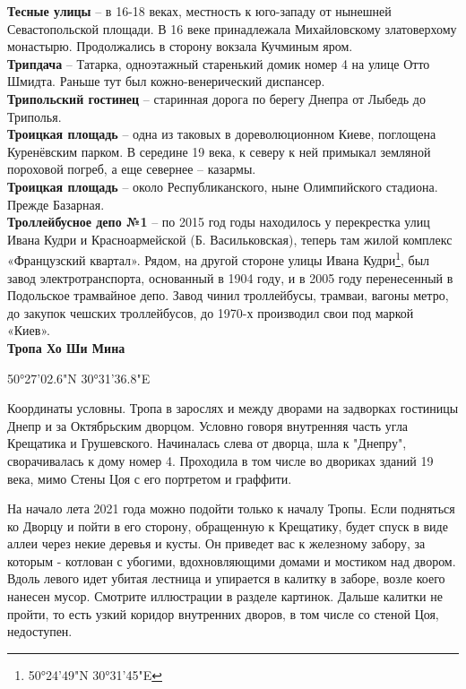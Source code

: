 \textbf{Тесные улицы} – в 16-18 веках, местность к юго-западу от нынешней Севастопольской площади. В 16 веке принадлежала Михайловскому златоверхому монастырю. Продолжались в сторону вокзала Кучминым яром.\\

\textbf{Трипдача} – Татарка, одноэтажный старенький домик номер 4 на улице Отто Шмидта. Раньше тут был кожно-венерический диспансер.\\

\textbf{Трипольский гостинец} – старинная дорога по берегу Днепра от Лыбедь до Триполья.\\

\textbf{Троицкая площадь} – одна из таковых в дореволюционном Киеве, поглощена Куренёвским парком. В середине 19 века, к северу к ней примыкал земляной пороховой погреб, а еще севернее – казармы.\\

\textbf{Троицкая площадь} – около Республиканского, ныне Олимпийского стадиона. Прежде Базарная.\\

\textbf{Троллейбусное депо №1} – по 2015 год годы находилось у перекрестка улиц Ивана Кудри и Красноармейской (Б. Васильковская), теперь там жилой комплекс «Французский квартал». Рядом, на другой стороне улицы Ивана Кудри\footnote{50°24'49"N 30°31'45"E}, был завод электротранспорта, основанный в 1904 году, и в 2005 году перенесенный в Подольское трамвайное депо. Завод чинил троллейбусы, трамваи, вагоны метро, до закупок чешских троллейбусов, до 1970-х производил свои под маркой «Киев».\\

\textbf{Тропа Хо Ши Мина}

50°27'02.6"N 30°31'36.8"E

Координаты условны. Тропа в зарослях и между дворами на задворках гостиницы Днепр и за Октябрьским дворцом. Условно говоря внутренняя часть угла Крещатика и Грушевского. Начиналась слева от дворца, шла к "Днепру", сворачивалась к дому номер 4. Проходила в том числе во двориках зданий 19 века, мимо Стены Цоя с его портретом и граффити.

На начало лета 2021 года можно подойти только к началу Тропы. Если подняться ко Дворцу и пойти в его сторону, обращенную к Крещатику, будет спуск в виде аллеи через некие деревья и кусты. Он приведет вас к железному забору, за которым - котлован с убогими, вдохновляющими домами и мостиком над двором. Вдоль левого идет убитая лестница и упирается в калитку в заборе, возле коего нанесен мусор. Смотрите иллюстрации в разделе картинок. Дальше калитки не пройти, то есть узкий коридор внутренних дворов, в том числе со стеной Цоя, недоступен.

